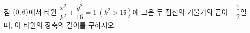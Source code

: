 점 $(0{,}\mkern3mu\mathopen{}6)$에서 타원 $\dfrac{x^2}{k^2}+\dfrac{y^2}{16}=1\ (k^2>16)$에 그은 두 접선의 기울기의 곱이 $-\dfrac{1}{2}$일 때, 이 타원의 장축의 길이를 구하시오.
